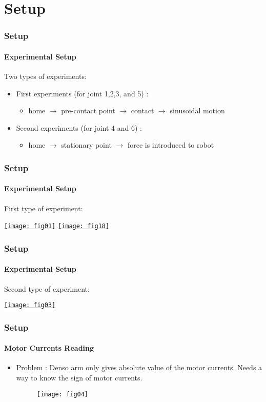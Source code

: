 \documentclass[12pt,english]{beamer}
\begin{document}
  \section{Setup}
  \begin{frame}
    \frametitle{Setup}
    \framesubtitle{Experimental Setup}
    Two types of experiments:
    \begin{itemize}
    \item First experiments (for joint 1,2,3, and 5) :
      \begin{itemize}
        \item home $\rightarrow$ pre-contact point $\rightarrow$ contact $\rightarrow$ sinusoidal motion
      \end{itemize}
    \item Second experiments (for joint 4 and 6) :
      \begin{itemize}
        \item home $\rightarrow$ stationary point $\rightarrow$ force is introduced to robot
      \end{itemize}
    \end{itemize}
  \end{frame}
  
  \begin{frame}
    \frametitle{Setup}
    \framesubtitle{Experimental Setup}
    First type of experiment:
    \begin{center}
      \href{run:exp_1.ogv}{\texttt{[image: fig01]}}
      \href{run:exp_2.ogv}{\texttt{[image: fig18]}}
    \end{center}
  \end{frame}
  
  \begin{frame}
    \frametitle{Setup}
    \framesubtitle{Experimental Setup}
    Second type of experiment:
    \begin{center}
      \href{run:exp_3.ogv}{\texttt{[image: fig03]}}
    \end{center}
  \end{frame}
  
  \begin{frame}
    \frametitle{Setup}
    \framesubtitle{Motor Currents Reading}
    \begin{itemize}
      \item Problem : Denso arm only gives absolute value of the motor currents. Needs a way to know the sign of motor currents.
      \begin{figure}
        \texttt{[image: fig04]}
      \end{figure}
    \end{itemize}
  \end{frame}  
  
\end{document}
